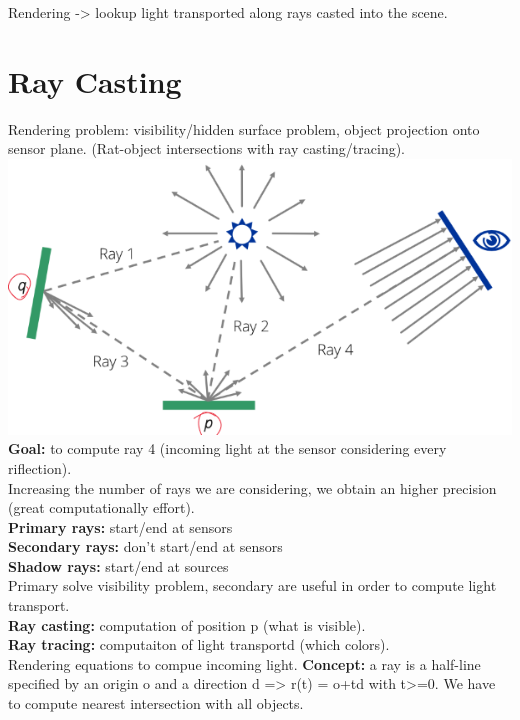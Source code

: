 \documentclass{article}
\begin{document}
Rendering -> lookup light transported along rays casted into the scene.
\newpage
\section{Ray Casting}
Rendering problem: visibility/hidden surface problem, object projection onto sensor plane. (Rat-object intersections with ray casting/tracing).\\
\includegraphics{image6.png}
\textbf{Goal:} to compute ray 4 (incoming light at the sensor considering every riflection).\\
Increasing the number of rays we are considering, we obtain an higher precision (great computationally effort).\\
\textbf{Primary rays: } start/end at sensors\\
\textbf{Secondary rays: } don't start/end at sensors\\
\textbf{Shadow rays: } start/end at sources\\
Primary solve visibility problem, secondary are useful in order to compute light transport.\\
\textbf{Ray casting: }computation of position p (what is visible).\\
\textbf{Ray tracing: }computaiton of light transportd (which colors).\\
Rendering equations to compue incoming light.
\textbf{Concept: }a ray is a half-line specified by an origin o and a direction d => r(t) = o+td with t>=0. We have to compute nearest intersection with all objects.
\end{document}
